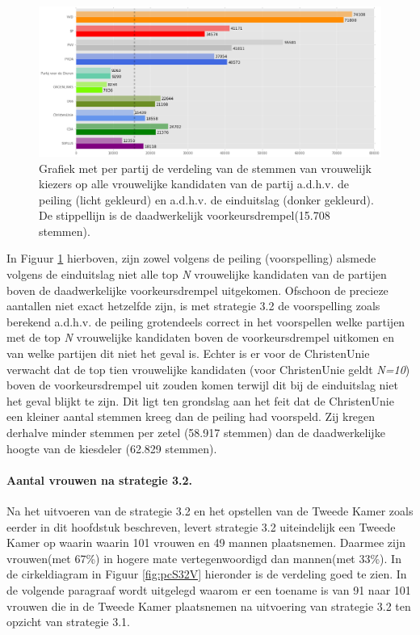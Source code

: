 \begin{figure}[H]

	\includegraphics[width=\linewidth]{stemmen_op_vrouwen_eigenX_samen.png}

			\caption{Grafiek met per partij de verdeling van de stemmen van vrouwelijk kiezers op alle vrouwelijke kandidaten van de partij a.d.h.v. de peiling (licht gekleurd) en a.d.h.v. de einduitslag (donker gekleurd). De stippellijn is de daadwerkelijk voorkeursdrempel(15.708 stemmen).}

\label{fig:stemmenS32V}
\end{figure}


In Figuur \ref{fig:stemmenS32V} hierboven, zijn zowel volgens de peiling (voorspelling) alsmede volgens de einduitslag niet alle top \textit{N} vrouwelijke kandidaten van de partijen boven de daadwerkelijke voorkeursdrempel uitgekomen. Ofschoon de precieze aantallen niet exact hetzelfde zijn, is met strategie 3.2 de voorspelling zoals berekend a.d.h.v. de peiling grotendeels correct in het voorspellen welke partijen met de top \textit{N}  vrouwelijke kandidaten boven de voorkeursdrempel uitkomen en van welke partijen dit niet het geval is. Echter is er voor de ChristenUnie verwacht dat de top tien vrouwelijke kandidaten (voor ChristenUnie geldt \textit{N=10}) boven de voorkeursdrempel uit zouden komen terwijl dit bij de einduitslag niet het geval blijkt te zijn. Dit ligt ten grondslag aan het feit dat de ChristenUnie een kleiner aantal stemmen kreeg dan de peiling had voorspeld. Zij kregen derhalve minder stemmen per zetel (58.917 stemmen) dan de daadwerkelijke hoogte van de kiesdeler (62.829 stemmen). 

\paragraph{Aantal vrouwen na strategie 3.2.}
Na het uitvoeren van de strategie 3.2 en het opstellen van de Tweede Kamer zoals eerder in dit hoofdstuk beschreven, levert strategie 3.2 uiteindelijk een Tweede Kamer op waarin waarin 101 vrouwen en 49 mannen plaatsnemen. Daarmee zijn vrouwen(met 67\%) in hogere mate vertegenwoordigd dan mannen(met 33\%). In de cirkeldiagram in Figuur \ref{fig:pcS32V} hieronder is de verdeling goed te zien. In de volgende paragraaf wordt uitgelegd waarom er een toename is van 91 naar 101 vrouwen die in de Tweede Kamer plaatsnemen na uitvoering van strategie 3.2 ten opzicht van strategie 3.1.

